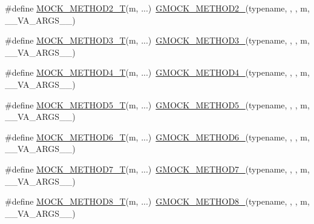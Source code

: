 \begin{DoxyCompactItemize}
\item 
\#define \hyperlink{gmock-generated-function-mockers_8h_adb6e8d8bd6ab614c62d8ecc2ec163e3c}{M\+O\+C\+K\+\_\+\+M\+E\+T\+H\+O\+D2\+\_\+T}(m, ...)~\hyperlink{gmock-generated-function-mockers_8h_a885295ca6bebb15efb3fc786218c5d47}{G\+M\+O\+C\+K\+\_\+\+M\+E\+T\+H\+O\+D2\+\_\+}(typename, , , m, \+\_\+\+\_\+\+V\+A\+\_\+\+A\+R\+G\+S\+\_\+\+\_\+)
\item 
\#define \hyperlink{gmock-generated-function-mockers_8h_a0b1576f68e6161f106e3d9ee7e3ac28b}{M\+O\+C\+K\+\_\+\+M\+E\+T\+H\+O\+D3\+\_\+T}(m, ...)~\hyperlink{gmock-generated-function-mockers_8h_af7c77ba511c631de02bb8c45a6ed3045}{G\+M\+O\+C\+K\+\_\+\+M\+E\+T\+H\+O\+D3\+\_\+}(typename, , , m, \+\_\+\+\_\+\+V\+A\+\_\+\+A\+R\+G\+S\+\_\+\+\_\+)
\item 
\#define \hyperlink{gmock-generated-function-mockers_8h_a17dde4ac8109f0bf1b73e3509e42c879}{M\+O\+C\+K\+\_\+\+M\+E\+T\+H\+O\+D4\+\_\+T}(m, ...)~\hyperlink{gmock-generated-function-mockers_8h_ab6430f2cfad9de4aca5258ea559294bb}{G\+M\+O\+C\+K\+\_\+\+M\+E\+T\+H\+O\+D4\+\_\+}(typename, , , m, \+\_\+\+\_\+\+V\+A\+\_\+\+A\+R\+G\+S\+\_\+\+\_\+)
\item 
\#define \hyperlink{gmock-generated-function-mockers_8h_a3566f9bd057c5cee1841f55cbf685947}{M\+O\+C\+K\+\_\+\+M\+E\+T\+H\+O\+D5\+\_\+T}(m, ...)~\hyperlink{gmock-generated-function-mockers_8h_a9e3ecd392499ab19a4a6d3adcabf56f6}{G\+M\+O\+C\+K\+\_\+\+M\+E\+T\+H\+O\+D5\+\_\+}(typename, , , m, \+\_\+\+\_\+\+V\+A\+\_\+\+A\+R\+G\+S\+\_\+\+\_\+)
\item 
\#define \hyperlink{gmock-generated-function-mockers_8h_a0d16357a0043d36b167a1c42ef33f672}{M\+O\+C\+K\+\_\+\+M\+E\+T\+H\+O\+D6\+\_\+T}(m, ...)~\hyperlink{gmock-generated-function-mockers_8h_ad0ca7f6973a076d0af4c953f8ed91842}{G\+M\+O\+C\+K\+\_\+\+M\+E\+T\+H\+O\+D6\+\_\+}(typename, , , m, \+\_\+\+\_\+\+V\+A\+\_\+\+A\+R\+G\+S\+\_\+\+\_\+)
\item 
\#define \hyperlink{gmock-generated-function-mockers_8h_a31bdd1d1448052f4122ecebf937a8f44}{M\+O\+C\+K\+\_\+\+M\+E\+T\+H\+O\+D7\+\_\+T}(m, ...)~\hyperlink{gmock-generated-function-mockers_8h_ab98a8399ba62b53b375c2807f4d39d2f}{G\+M\+O\+C\+K\+\_\+\+M\+E\+T\+H\+O\+D7\+\_\+}(typename, , , m, \+\_\+\+\_\+\+V\+A\+\_\+\+A\+R\+G\+S\+\_\+\+\_\+)
\item 
\#define \hyperlink{gmock-generated-function-mockers_8h_aa7e6573bb6a57f2a2d3c2875caeffaa3}{M\+O\+C\+K\+\_\+\+M\+E\+T\+H\+O\+D8\+\_\+T}(m, ...)~\hyperlink{gmock-generated-function-mockers_8h_aa84a36427c44505207b7cad5dec7ad67}{G\+M\+O\+C\+K\+\_\+\+M\+E\+T\+H\+O\+D8\+\_\+}(typename, , , m, \+\_\+\+\_\+\+V\+A\+\_\+\+A\+R\+G\+S\+\_\+\+\_\+)

\end{DoxyCompactItemize}
